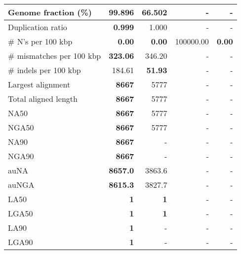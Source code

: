 \documentclass[12pt,a4paper]{article}
\begin{document}
\begin{table}[ht]
\begin{center}
\begin{tabular}{|l*{4}{|r}|}
Genome fraction (\%) & {\bf 99.896} & 66.502 & - & - \\ \hline
Duplication ratio & {\bf 0.999} & 1.000 & - & - \\ \hline
\# N's per 100 kbp & {\bf 0.00} & {\bf 0.00} & 100000.00 & {\bf 0.00} \\ \hline
\# mismatches per 100 kbp & {\bf 323.06} & 346.20 & - & - \\ \hline
\# indels per 100 kbp & 184.61 & {\bf 51.93} & - & - \\ \hline
Largest alignment & {\bf 8667} & 5777 & - & - \\ \hline
Total aligned length & {\bf 8667} & 5777 & - & - \\ \hline
NA50 & {\bf 8667} & 5777 & - & - \\ \hline
NGA50 & {\bf 8667} & 5777 & - & - \\ \hline
NA90 & {\bf 8667} & - & - & - \\ \hline
NGA90 & {\bf 8667} & - & - & - \\ \hline
auNA & {\bf 8657.0} & 3863.6 & - & - \\ \hline
auNGA & {\bf 8615.3} & 3827.7 & - & - \\ \hline
LA50 & {\bf 1} & {\bf 1} & - & - \\ \hline
LGA50 & {\bf 1} & {\bf 1} & - & - \\ \hline
LA90 & {\bf 1} & - & - & - \\ \hline
LGA90 & {\bf 1} & - & - & - \\ \hline
\end{tabular}
\end{center}
\end{table}
\end{document}
